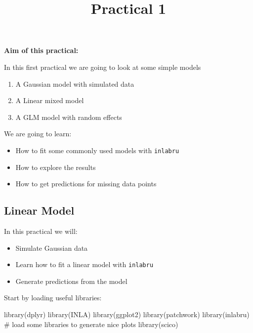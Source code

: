 \documentclass[
  letterpaper,
  DIV=11,
  numbers=noendperiod]{scrartcl}
\title{Practical 1}
\author{}
\date{}
\makeatletter
\newenvironment{Shaded}{\begin{snugshade}}{\end{snugshade}}
\newcommand{\CommentTok}[1]{\textcolor[rgb]{0.37,0.37,0.37}{#1}}
\newcommand{\FunctionTok}[1]{\textcolor[rgb]{0.28,0.35,0.67}{#1}}
\newcommand{\NormalTok}[1]{\textcolor[rgb]{0.00,0.23,0.31}{#1}}
\providecommand{\tightlist}{%
  \setlength{\itemsep}{0pt}\setlength{\parskip}{0pt}}\usepackage{longtable,booktabs,array}
\renewcommand{\maketitle}{\bgroup\setlength{\parindent}{0pt}
\begin{flushleft}
  {\sffamily\huge\textbf{\MakeUppercase{\@title}}} \vspace{0.3cm} \newline
  {\Large {\@subtitle}} \newline
  \@author
\end{flushleft}\egroup
}
\makeatother
\begin{document}
\maketitle

\pagestyle{mystyle}


\textbf{Aim of this practical:}

In this first practical we are going to look at some simple models

\begin{enumerate}
\def\labelenumi{\arabic{enumi}.}
\item
  A Gaussian model with simulated data
\item
  A Linear mixed model
\item
  A GLM model with random effects
\end{enumerate}

We are going to learn:

\begin{itemize}
\item
  How to fit some commonly used models with \texttt{inlabru}
\item
  How to explore the results
\item
  How to get predictions for missing data points
\end{itemize}

\subsection{Linear Model}\label{sec-linmodel}

In this practical we will:

\begin{itemize}
\tightlist
\item
  Simulate Gaussian data
\item
  Learn how to fit a linear model with \texttt{inlabru}
\item
  Generate predictions from the model
\end{itemize}

Start by loading useful libraries:

\begin{Shaded}
\begin{Highlighting}[]
\FunctionTok{library}\NormalTok{(dplyr)}
\FunctionTok{library}\NormalTok{(INLA)}
\FunctionTok{library}\NormalTok{(ggplot2)}
\FunctionTok{library}\NormalTok{(patchwork)}
\FunctionTok{library}\NormalTok{(inlabru)     }
\CommentTok{\# load some libraries to generate nice plots}
\FunctionTok{library}\NormalTok{(scico)}
\end{Highlighting}
\end{Shaded}
\end{document}
